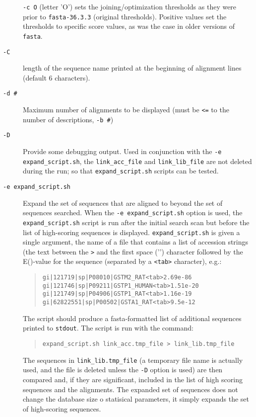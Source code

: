 \documentclass[11pt]{article}
\begin{document}
\begin{description}
\texttt{-c O} (letter 'O') sets the joining/optimization
thresholds as they were prior to \texttt{fasta-36.3.3} (original thresholds). Positive
values set the thresholds to specific score values, as was the case
in older versions of \texttt{fasta}.

\item[\texttt{-C}]
length of the sequence name printed at the beginning of alignment
lines (default 6 characters).
\item[\texttt{-d \#}]
Maximum number of alignments to be displayed (must be \texttt{<=} to the number of descriptions, \texttt{-b \#})
\item[\texttt{-D}]
  Provide some debugging output.  Used in conjunction
  with the \texttt{-e expand\_script.sh}, the \texttt{link\_acc\_file}
  and \texttt{link\_lib\_file} are not deleted during the run; so that
  \texttt{expand\_script.sh} scripts can be tested.

\item[\texttt{-e expand\_script.sh}]

  Expand the set of sequences that
  are aligned to beyond the set of sequences searched. When the
  \texttt{-e expand\_script.sh} option is used, the
  \texttt{expand\_script.sh} script is run after the initial search
  scan but before the list of high-scoring sequences is displayed.
  \texttt{expand\_script.sh} is given a single argument, the name of a
  file that contains a list of accession strings (the text between the
  \texttt{>} and the first space ('\textvisiblespace') character
  followed by the E()-value for the sequence (separated by a
  \texttt{<tab>} character), e.g.:
\begin{quote}
\begin{verbatim}
gi|121719|sp|P08010|GSTM2_RAT<tab>2.69e-86
gi|121746|sp|P09211|GSTP1_HUMAN<tab>1.51e-20
gi|121749|sp|P04906|GSTP1_RAT<tab>1.16e-19
gi|62822551|sp|P00502|GSTA1_RAT<tab>9.5e-12
\end{verbatim}
\end{quote}
The script should produce a fasta-formatted list of additional
sequences printed to \texttt{stdout}.  The script is run with the command:
\begin{quote}
\begin{verbatim}
expand_script.sh link_acc.tmp_file > link_lib.tmp_file
\end{verbatim}
\end{quote}
The sequences in \texttt{link\_lib.tmp\_file} (a temporary file name is
actually used, and the file is deleted unless the \texttt{-D} option
is used) are then compared and, if they are significant, included in
the list of high scoring sequences and the alignments.  The expanded
set of sequences does not change the database size o statisical
parameters, it simply expands the set of high-scoring sequences.


\end{description}
\end{document}
